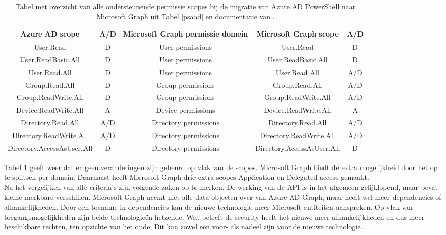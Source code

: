 \begin{table}[h!]
    \centering
    \begin{adjustbox}{max width=\textwidth}
    \begin{tabular}{ |c|c||c|c|c| } 
        \hline
        \textbf{Azure AD scope} & \textbf{A/D} & \textbf{Microsoft Graph permissie domein} & \textbf{Microsoft Graph scope} & \textbf{A/D} \\
        \hline
        User.Read & D & User permissions & User.Read & D \\
        User.ReadBasic.All & D & User permissions & User.ReadBasic.All & D \\
        User.Read.All & D & User permissions & User.Read.All & A/D \\
        Group.Read.All & D & Group permissions & Group.Read.All & A/D \\
        Group.ReadWrite.All & D & Group permissions & Group.ReadWrite.All & A/D \\
        Device.ReadWrite.All & A & Device permissions & Device.ReadWrite.All & A \\
        Directory.Read.All & A/D & Directory permissions & Directory.Read.All & A/D \\
        Directory.ReadWrite.All & A/D & Directory permissions & Directory.ReadWrite.All & A/D \\
        Directory.AccessAsUser.All & D & Directory permissions & Directory.AccessAsUser.All & D \\ 
        \hline
    \end{tabular}
    \end{adjustbox}
    \caption[Tabel migratie Azure AD permissie scopes naar Microsoft Graph]{Tabel met overzicht van alle ondersteunende permissie scopes bij de migratie van Azure \ac{AD} PowerShell naar Microsoft Graph uit Tabel \ref{psaad} en documentatie van \textcite{Microsoft2023p}.}
    \label{AADMSGPS}
\end{table}

Tabel \ref{AADMSGPS} geeft weer dat er geen veranderingen zijn gebeurd op vlak van de scopes. Microsoft Graph biedt de extra mogelijkheid door het op te splitsen per domein. Daarnaast heeft Microsoft Graph drie extra scopes Application en Delegated-access gemaakt. \\

Na het vergelijken van alle criteria's zijn volgende zaken op te merken. De werking van de \Ac{API} is in het algemeen gelijklopend, maar bevat kleine merkbare verschillen. Microsoft Graph neemt niet alle data-objecten over van Azure \ac{AD} Graph, maar heeft wel meer dependencies of afhankelijkheden. Door een toename in dependencies kan de nieuwe technologie meer Microsoft-entiteiten aanspreken. Op vlak van toegangsmogelijkheden zijn beide technologieën hetzelfde. Wat betreft de security heeft het nieuwe meer afhankelijkheden en dus meer beschikbare rechten, ten opzichte van het oude. Dit kan zowel een voor- als nadeel zijn voor de nieuwe technologie.
